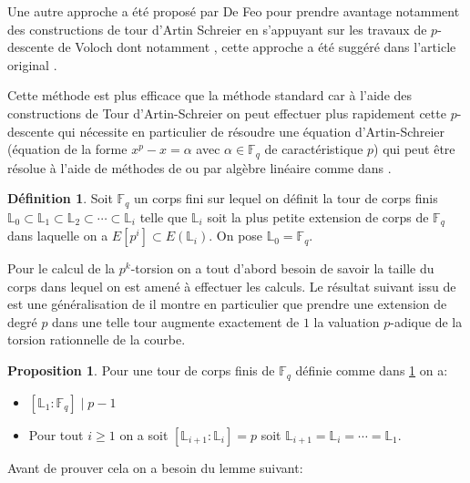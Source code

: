 \documentclass[10pt,a4paper]{book}
\theoremstyle{plain}
\theoremstyle{definition}
\theoremstyle{definition}
\theoremstyle{definition}
\newtheorem{prop}[thm]{Proposition}
\theoremstyle{definition}
\newtheorem{defi}[thm]{Définition}
\theoremstyle{remark}
\theoremstyle{remark}
\theoremstyle{definition}
\begin{document}
Une autre approche a été proposé par De Feo pour prendre avantage notamment des
constructions de tour d'Artin Schreier en s'appuyant sur les travaux de 
$p$-descente de Voloch dont notamment \cite[Lemma 1.1]{Voloch90}, cette 
approche a été suggéré dans l'article original \cite{Couveignes96}. 

Cette méthode est plus efficace que la méthode standard car à l'aide des 
constructions de Tour d'Artin-Schreier on peut effectuer plus rapidement cette 
$p$-descente qui nécessite en particulier de résoudre une équation 
d'Artin-Schreier (équation de la forme $x^p-x=\alpha$ avec $\alpha \in 
\mathbb{F}_q$ de caractéristique $p$) qui peut être résolue à l'aide de 
méthodes de \cite[§6.1]{DeFeo-Shost'12} ou par algèbre linéaire comme dans 
\cite{Couveignes96}. 

\begin{defi}
\label{def:p-adic:level}
Soit $\mathbb{F}_q$ un corps fini sur lequel on définit la tour de corps finis 
$\mathbb{L}_0 \subset  \mathbb{L}_1 \subset \mathbb{L}_2 \subset \cdots \subset
\mathbb{L}_i$ telle que $\mathbb{L}_i$ soit la plus petite extension de corps 
de $\mathbb{F}_q$ dans laquelle on a $E[p^i] \subset E(\mathbb{L}_i)$. On pose 
$\mathbb{L}_0=\mathbb{F}_q$.
\end{defi}

Pour le calcul de la $p^k$-torsion on a tout d'abord besoin de savoir la taille
du corps dans lequel on est amené à effectuer les calculs. %
Le résultat suivant issu de \cite{DeFeo10} est une généralisation de \cite[Proposition 26]{Ler97a} il montre en particulier que prendre une extension de degré $p$ dans une telle tour augmente exactement de $1$ la valuation $p$-adique de la torsion rationnelle de la courbe.

\begin{prop}
\label{pro:ord:fro}
Pour une tour de corps finis de $\mathbb{F}_q$ définie comme dans \ref{def:p-adic:level} on a:
\begin{itemize}
\item $[\mathbb{L}_1:\mathbb{F}_q] \mid p-1$
\item Pour tout $i \geqslant 1$ on a soit $[\mathbb{L}_{i+1}:\mathbb{L}_{i}]=p$ soit $\mathbb{L}_{i+1}=\mathbb{L}_{i}=\cdots = \mathbb{L}_{1}$.
\end{itemize}
\end{prop}

Avant de prouver cela on a besoin du lemme suivant:
\end{document}
